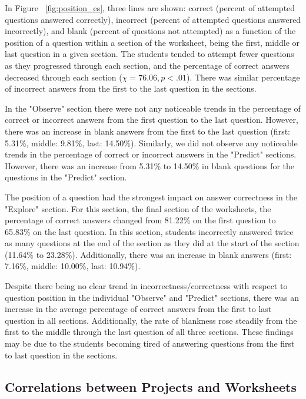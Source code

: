 {In Figure ~\ref{fig:position_es}, three lines are shown: correct (percent of attempted questions answered correctly), incorrect (percent of attempted questions answered incorrectly), and blank (percent of questions not attempted) as a function of the position of a question within a section of the worksheet, being the first, middle or last question in a given section. The students tended to attempt fewer questions as they progressed through each section, and the percentage of correct answers decreased through each section (\begin{math}\chi=76.06, p<.01\end{math}). There was similar percentage of incorrect answers from the first to the last question in the sections.

In the "Observe" section there were not any noticeable trends in the percentage of correct or incorrect answers from the first question to the last question. However, there was an increase in blank answers from the first to the last question (first: 5.31\%, middle: 9.81\%, last: 14.50\%). Similarly, we did not observe any noticeable trends in the percentage of correct or incorrect answers in the "Predict" sections. However, there was an increase from 5.31\% to 14.50\% in blank questions for the questions in the "Predict" section.

The position of a question had the strongest impact on answer correctness in the "Explore" section.  For this section, the final section of the worksheets, the percentage of correct answers changed from 81.22\% on the first question to 65.83\% on the last question. In this section, students incorrectly answered twice as many questions at the end of the section as they did at the start of the section (11.64\% to 23.28\%). Additionally, there was an increase in blank answers (first: 7.16\%, middle: 10.00\%, last: 10.94\%).

Despite there being no clear trend in incorrectness/correctness with respect to question position in the individual "Observe" and "Predict" sections, there was an increase in the average percentage of correct answers from the first to last question in all sections. Additionally, the rate of blankness rose steadily from the first to the middle through the last question of all three sections. These findings may be due to the students becoming tired of answering questions from the first to last question in the sections.

\subsection{Correlations between Projects and Worksheets}

}
